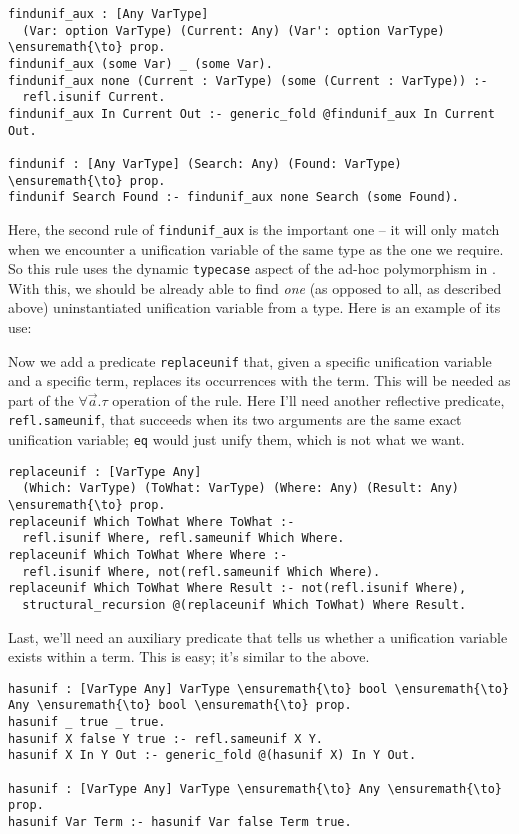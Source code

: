 \begin{verbatim}
findunif_aux : [Any VarType]
  (Var: option VarType) (Current: Any) (Var': option VarType) \ensuremath{\to} prop.
findunif_aux (some Var) _ (some Var).
findunif_aux none (Current : VarType) (some (Current : VarType)) :-
  refl.isunif Current.
findunif_aux In Current Out :- generic_fold @findunif_aux In Current Out.

findunif : [Any VarType] (Search: Any) (Found: VarType) \ensuremath{\to} prop.
findunif Search Found :- findunif_aux none Search (some Found).
\end{verbatim}

Here, the second rule of \texttt{findunif\_aux} is the important one --
it will only match when we encounter a unification variable of the same
type as the one we require. So this rule uses the dynamic
\texttt{typecase} aspect of the ad-hoc polymorphism in \lamprolog. With
this, we should be already able to find \emph{one} (as opposed to all,
as described above) uninstantiated unification variable from a type.
Here is an example of its use:

Now we add a predicate \texttt{replaceunif} that, given a specific
unification variable and a specific term, replaces its occurrences with
the term. This will be needed as part of the \(\forall \vec{a}.\tau\)
operation of the rule. Here I'll need another reflective predicate,
\texttt{refl.sameunif}, that succeeds when its two arguments are the
same exact unification variable; \texttt{eq} would just unify them,
which is not what we want.

\begin{verbatim}
replaceunif : [VarType Any]
  (Which: VarType) (ToWhat: VarType) (Where: Any) (Result: Any) \ensuremath{\to} prop.
replaceunif Which ToWhat Where ToWhat :-
  refl.isunif Where, refl.sameunif Which Where.
replaceunif Which ToWhat Where Where :-
  refl.isunif Where, not(refl.sameunif Which Where).
replaceunif Which ToWhat Where Result :- not(refl.isunif Where),
  structural_recursion @(replaceunif Which ToWhat) Where Result.
\end{verbatim}

Last, we'll need an auxiliary predicate that tells us whether a
unification variable exists within a term. This is easy; it's similar to
the above.

\begin{verbatim}
hasunif : [VarType Any] VarType \ensuremath{\to} bool \ensuremath{\to} Any \ensuremath{\to} bool \ensuremath{\to} prop.
hasunif _ true _ true.
hasunif X false Y true :- refl.sameunif X Y.
hasunif X In Y Out :- generic_fold @(hasunif X) In Y Out.

hasunif : [VarType Any] VarType \ensuremath{\to} Any \ensuremath{\to} prop.
hasunif Var Term :- hasunif Var false Term true.
\end{verbatim}

